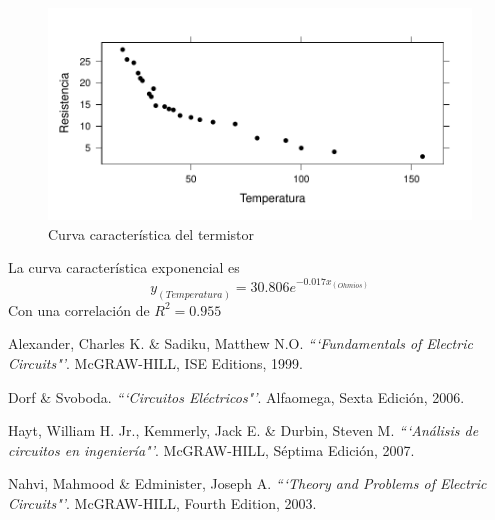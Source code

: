\documentclass[twocolumn]{IEEEtran}
\begin{document}
\begin{figure}[H]
	\centering
		\includegraphics[scale=0.6]{curva.pdf}
	\caption{Curva característica del termistor}
	\label{fig3}
\end{figure} 
\noindent
La curva característica exponencial es
\begin{equation}
 {y_{(Temperatura)}} = 30.806{e^{ - 0.017{x_{(Ohmios)}}}}
\label{ecu1}
\end{equation}
\noindent
Con una correlación de $R^2 = 0.955$



\begin{thebibliography}{99}
 Alexander, Charles K. \&  Sadiku, Matthew N.O.
{\em ```Fundamentals of Electric Circuits"'}.
McGRAW-HILL, ISE Editions, 1999.

 Dorf  \& Svoboda.
{\em ```Circuitos Eléctricos"'}.
Alfaomega, Sexta Edición, 2006.

 Hayt, William H. Jr., Kemmerly, Jack E. \& Durbin, Steven M.
{\em ```Análisis de circuitos en ingeniería"'}.
McGRAW-HILL, Séptima Edición, 2007.

 Nahvi, Mahmood \& Edminister, Joseph A.
{\em ```Theory and Problems of Electric Circuits"'}.
McGRAW-HILL, Fourth Edition, 2003.

\end{thebibliography}
\end{document}
